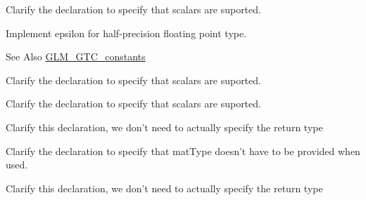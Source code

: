 
\begin{DoxyRefList}
\item[\label{todo__todo000003}%
\hypertarget{todo__todo000003}{}%
Member \hyperlink{group__core__func__integer_ga5c4d37c42926b09be4384a9656f73ee4}{glm\-:\-:bit\-Count} (gen\-I\-U\-Type$<$ T $>$ const \&Value)]Clarify the declaration to specify that scalars are suported.  
\item[\label{todo__todo000009}%
\hypertarget{todo__todo000009}{}%
Member \hyperlink{group__gtc__constants_ga2b53267cfa3c8aa96c02cdba04c53ef5}{glm\-:\-:epsilon} ()]Implement epsilon for half-\/precision floating point type. \begin{DoxySeeAlso}{See Also}
\hyperlink{group__gtc__constants}{G\-L\-M\-\_\-\-G\-T\-C\-\_\-constants}  
\end{DoxySeeAlso}

\item[\label{todo__todo000004}%
\hypertarget{todo__todo000004}{}%
Member \hyperlink{group__core__func__integer_gaf921488d20990ec15f3fde3d1db919f0}{glm\-:\-:find\-L\-S\-B} (gen\-I\-U\-Type$<$ T $>$ const \&Value)]Clarify the declaration to specify that scalars are suported.  
\item[\label{todo__todo000005}%
\hypertarget{todo__todo000005}{}%
Member \hyperlink{group__core__func__integer_gaa17f942299cb7a51c60155f9e78228f3}{glm\-:\-:find\-M\-S\-B} (gen\-I\-U\-Type$<$ T $>$ const \&Value)]Clarify the declaration to specify that scalars are suported.  
\item[\label{todo__todo000001}%
\hypertarget{todo__todo000001}{}%
Member \hyperlink{group__core__func__common_ga15f7f0f93ebb026338cb3d7d5876e1b7}{glm\-:\-:int\-Bits\-To\-Float} (gen\-I\-Type const \&value)]Clarify this declaration, we don't need to actually specify the return type  
\item[\label{todo__todo000006}%
\hypertarget{todo__todo000006}{}%
Member \hyperlink{group__core__func__matrix_ga5d896e8651512fc098a677dbe403eeac}{glm\-:\-:outer\-Product} (vec\-Type const \&c, vec\-Type const \&r)]Clarify the declaration to specify that mat\-Type doesn't have to be provided when used.  
\item[\label{todo__todo000002}%
\hypertarget{todo__todo000002}{}%
Member \hyperlink{group__core__func__common_ga3e4a94c90cffac713c287d1fb7b51c08}{glm\-:\-:uint\-Bits\-To\-Float} (gen\-U\-Type const \&value)]Clarify this declaration, we don't need to actually specify the return type 
\end{DoxyRefList}